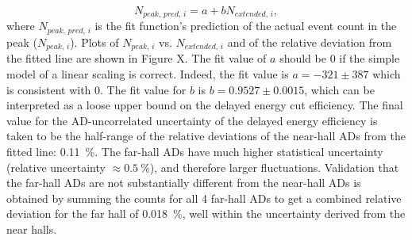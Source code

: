 \begin{equation}
    N_{peak,\,pred,\,i} = a + b N_{extended,\,i},
\end{equation}
where $N_{peak,\,pred,\,i}$ is the fit function's prediction
of the actual event count in the peak ($N_{peak,\,i}$).
Plots of $N_{peak,\,i}$ vs. $N_{extended,\,i}$ and of the
relative deviation from the fitted line are shown in Figure X. %
The fit value of $a$ should be $0$ if the simple model of
a linear scaling is correct.
Indeed, the fit value is $a = -321 \pm 387$
which is consistent with $0$.
The fit value for $b$ is $b = 0.9527 \pm 0.0015$,
which can be interpreted as a loose upper bound
on the delayed energy cut efficiency.
The final value for the AD-uncorrelated uncertainty
of the delayed energy efficiency is taken to be
the half-range of the relative deviations
of the near-hall ADs from the fitted line: \SI{0.11}{\percent}.
The far-hall ADs have much higher statistical uncertainty
(relative uncertainty $\approx\SI{0.5}{\percent}$),
and therefore larger fluctuations.
Validation that the far-hall ADs are not
substantially different from the near-hall ADs is obtained by
summing the counts for all 4 far-hall ADs to get
a combined relative deviation for the far hall of \SI{0.018}{\percent},
well within the uncertainty derived from the near halls.


